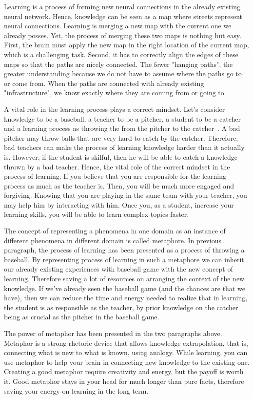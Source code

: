 \documentclass{article}
\begin{document}
Learning is a process of forming new neural connections in the already existing neural network. Hence, knowledge can be seen as a map where streets represent neural connections. Learning is merging a new map with the current one we already posses. Yet, the process of merging these two maps is nothing but easy. First, the brain must apply the new map in the right location of the current map, which is a challenging task. Second, it has to correctly align the edges of these maps so that the paths are nicely connected. The fewer "hanging paths", the greater understanding because we do not have to assume where the paths go to or come from. When the paths are connected with already existing "infrastructure", we know exactly where they are coming from or going to. 

A vital role in the learning process plays a correct mindset. Let's consider knowledge to be a baseball, a teacher to be a pitcher, a student to be a catcher and a learning process as throwing the from the pitcher to the catcher~\cite{adler2014read}. A bad pitcher may throw balls that are very hard to catch by the catcher. Therefore, bad teachers can make the process of learning knowledge harder than it actually is. However, if the student is skilful, then he will be able to catch a knowledge thrown by a bad teacher. Hence, the vital role of the correct mindset in the process of learning. If you believe that you are responsible for the learning process as much as the teacher is. Then, you will be much more engaged and forgiving. Knowing that you are playing in the same team with your teacher, you may help him by interacting with him. Once you, as a student, increase your learning skills, you will be able to learn complex topics faster.

The concept of representing a phenomena in one domain as an instance of different phenomena in different domain is called metaphore. In previous paragraph, the process of learning has been presented as a process of throwing a baseball. By representing process of learning in such a metaphore we can inherit our already existing experiences with baseball game with the new concept of learning. Therefore saving a lot of resources on arranging the context of the new knowledge. If we've already seen the baseball game (and the chances are that we have), then we can reduce the time and energy needed to realize that in learning, the student is as responsible as the teacher, by prior knowledge on the catcher being as crucial as the pitcher in the baseball game.

The power of metaphor has been presented in the two paragraphs above. Metaphor is a strong rhetoric device that allows knowledge extrapolation, that is, connecting what is new to what is known, using analogy. While learning, you can use metaphor to help your brain in connecting new knowledge to the existing one. Creating a good metaphor require creativity and energy, but the payoff is worth it. Good metaphor stays in your head for much longer than pure facts, therefore saving your energy on learning in the long term. 




\end{document}
